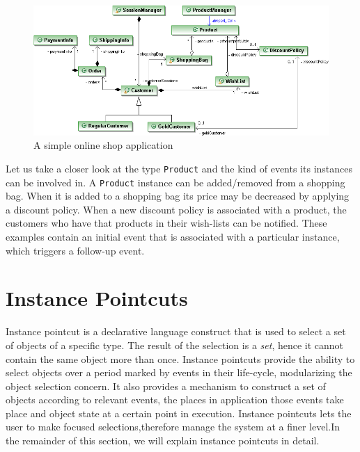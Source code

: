 \documentclass{llncs}
\begin{document}
\begin{figure}[h]
\includegraphics[width=\textwidth]{images/onlineshop1.png}%
\caption{A simple online shop application}%
\label{fig:shop}%
\end{figure}

Let us take a closer look at the type \texttt{Product} and the kind of events its instances can be involved in. A \texttt{Product} instance can be added/removed from a shopping bag. When it is added to a shopping bag its price may be decreased by applying a discount policy. When a new discount policy is associated with a product, the customers who have that products in their wish-lists can be notified. These examples contain an initial event that is associated with a particular instance, which triggers a follow-up event. 



\section{Instance Pointcuts}

Instance pointcut is a declarative language construct that is used to select a set of objects of a specific type. The result of the selection is a \emph{set}, hence it cannot contain the same object more than once. Instance pointcuts provide the ability to select objects over a period marked by events in their life-cycle, modularizing the object selection concern. It also provides a mechanism to construct a set of objects according to relevant events, the places in application those events take place and object state at a certain point in execution. Instance pointcuts lets the user to make focused selections,therefore manage the system at a finer level.In the remainder of this section, we will explain instance pointcuts in detail. 
\end{document}
